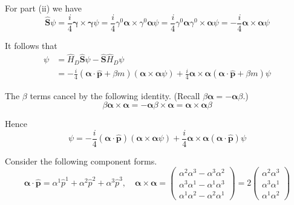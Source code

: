For part (ii) we have
\begin{equation*}
\hat{\mathbf S}\psi
=\frac{i}{4}\boldsymbol\gamma\times\boldsymbol\gamma\psi
=\frac{i}{4}\gamma^0\boldsymbol\alpha\times\gamma^0\boldsymbol\alpha\psi
=\frac{i}{4}\gamma^0\boldsymbol\alpha\gamma^0\times\boldsymbol\alpha\psi
=-\frac{i}{4}\boldsymbol\alpha\times\boldsymbol\alpha\psi
\end{equation*}

It follows that
\begin{align*}
[\hat H_D,\hat{\mathbf S}]\psi
&=\hat H_D\hat{\mathbf S}\psi-\hat{\mathbf S}\hat H_D\psi
\\
&=-\frac{i}{4}(\boldsymbol\alpha\cdot\hat{\mathbf p}+\beta m)(\boldsymbol\alpha\times\boldsymbol\alpha\psi)
+\frac{i}{4}\boldsymbol\alpha\times\boldsymbol\alpha(\boldsymbol\alpha\cdot\hat{\mathbf p}+\beta m)\psi
\end{align*}

The $\beta$ terms cancel by the following identity.
(Recall $\beta\boldsymbol\alpha=-\boldsymbol\alpha\beta$.)
\begin{equation*}
\beta\boldsymbol\alpha\times\boldsymbol\alpha
=-\boldsymbol\alpha\beta\times\boldsymbol\alpha
=\boldsymbol\alpha\times\boldsymbol\alpha\beta
\end{equation*}

Hence
\begin{equation*}
[\hat H_D,\hat{\mathbf S}]\psi
=-\frac{i}{4}(\boldsymbol\alpha\cdot\hat{\mathbf p})(\boldsymbol\alpha\times\boldsymbol\alpha\psi)
+\frac{i}{4}\boldsymbol\alpha\times\boldsymbol\alpha(\boldsymbol\alpha\cdot\hat{\mathbf p})\psi
\end{equation*}

Consider the following component forms.
\begin{equation*}
\boldsymbol\alpha\cdot\hat{\mathbf p}
=\alpha^1\hat p^1+\alpha^2\hat p^2+\alpha^3\hat p^3,
\quad
\boldsymbol\alpha\times\boldsymbol\alpha
=\begin{pmatrix}
\alpha^2\alpha^3-\alpha^3\alpha^2
\\
\alpha^3\alpha^1-\alpha^1\alpha^3
\\
\alpha^1\alpha^2-\alpha^2\alpha^1
\end{pmatrix}
=2\begin{pmatrix}
\alpha^2\alpha^3
\\
\alpha^3\alpha^1
\\
\alpha^1\alpha^2
\end{pmatrix}
\end{equation*}


